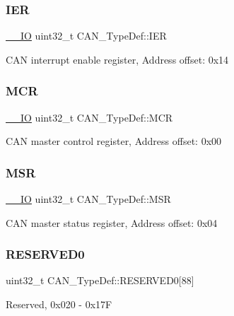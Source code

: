 \subsubsection{\texorpdfstring{IER}{IER}}
{\footnotesize\ttfamily \mbox{\hyperlink{core__sc300_8h_aec43007d9998a0a0e01faede4133d6be}{\+\_\+\+\_\+\+IO}} uint32\+\_\+t C\+A\+N\+\_\+\+Type\+Def\+::\+I\+ER}

C\+AN interrupt enable register, Address offset\+: 0x14 \mbox{\label{struct_c_a_n___type_def_a1282eee79a22003257a7a5daa7f4a35f}} 
\subsubsection{\texorpdfstring{MCR}{MCR}}
{\footnotesize\ttfamily \mbox{\hyperlink{core__sc300_8h_aec43007d9998a0a0e01faede4133d6be}{\+\_\+\+\_\+\+IO}} uint32\+\_\+t C\+A\+N\+\_\+\+Type\+Def\+::\+M\+CR}

C\+AN master control register, Address offset\+: 0x00 \mbox{\label{struct_c_a_n___type_def_af98b957a4e887751fbd407d3e2cf93b5}} 
\subsubsection{\texorpdfstring{MSR}{MSR}}
{\footnotesize\ttfamily \mbox{\hyperlink{core__sc300_8h_aec43007d9998a0a0e01faede4133d6be}{\+\_\+\+\_\+\+IO}} uint32\+\_\+t C\+A\+N\+\_\+\+Type\+Def\+::\+M\+SR}

C\+AN master status register, Address offset\+: 0x04 \mbox{\label{struct_c_a_n___type_def_ad0cc7fb26376c435bbf148e962739337}} 
\subsubsection{\texorpdfstring{RESERVED0}{RESERVED0}}
{\footnotesize\ttfamily uint32\+\_\+t C\+A\+N\+\_\+\+Type\+Def\+::\+R\+E\+S\+E\+R\+V\+E\+D0\mbox{[}88\mbox{]}}

Reserved, 0x020 -\/ 0x17F \mbox{\label{struct_c_a_n___type_def_a046ef464378aaaaafaf999c23a4dc55e}} 
